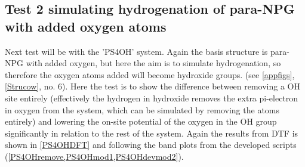 \subsection{Test 2 simulating hydrogenation of para-NPG with added oxygen atoms}
Next test will be with the 'PS4OH' system. Again the basis structure is para-NPG with added oxygen, but here the aim is to simulate hydrogenation, so therefore the oxygen atoms added will become hydroxide groups. (see \cref{appfigs}, \cref{Strucow}, no. 6). Here the test is to show the difference between removing a OH site entirely (effectively the hydrogen in hydroxide removes the extra pi-electron in oxygen from the system, which can be simulated by removing the atoms entirely) and lowering the on-site potential of the oxygen in the OH group significantly in relation to the rest of the system. Again the results from DTF is shown in \cref{PS4OHDFT} and following the band plots from the developed scripts (\cref{PS4OHremove,PS4OHmod1,PS4OHdevmod2}). 
